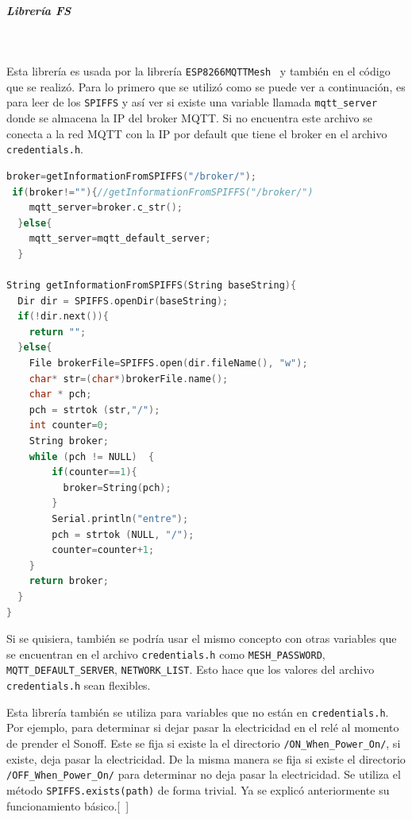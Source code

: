 \subparagraph{Librería FS}~

Esta librería es usada por la librería \lstinline[columns=fixed]{ESP8266MQTTMesh}~ y también en el código que se realizó. Para lo primero que se utilizó como se puede ver a continuación,  es para leer de los \lstinline[columns=fixed]{SPIFFS} y así ver si existe una variable llamada \lstinline[columns=fixed]{mqtt_server} donde se almacena la IP del broker MQTT. Si no encuentra este archivo se conecta a  la red MQTT con la IP por default que tiene el broker en el archivo \lstinline[columns=fixed]{credentials.h}.

\begin{lstlisting}[language=C]
broker=getInformationFromSPIFFS("/broker/");
 if(broker!=""){//getInformationFromSPIFFS("/broker/")
    mqtt_server=broker.c_str();
  }else{
    mqtt_server=mqtt_default_server;
  }

String getInformationFromSPIFFS(String baseString){
  Dir dir = SPIFFS.openDir(baseString);
  if(!dir.next()){
    return "";
  }else{
    File brokerFile=SPIFFS.open(dir.fileName(), "w");
    char* str=(char*)brokerFile.name();
    char * pch;
    pch = strtok (str,"/");
    int counter=0;
    String broker;
    while (pch != NULL)  {
        if(counter==1){
          broker=String(pch);
        }
        Serial.println("entre");
        pch = strtok (NULL, "/");
        counter=counter+1;
    }
    return broker;
  }
}
\end{lstlisting}

Si se quisiera, también se podría usar el mismo concepto con otras variables que se encuentran en el archivo \lstinline[columns=fixed]{credentials.h} como \lstinline[columns=fixed]{MESH_PASSWORD}, \lstinline[columns=fixed]{MQTT_DEFAULT_SERVER}, \lstinline[columns=fixed]{NETWORK_LIST}. Esto hace que los valores del archivo \lstinline[columns=fixed]{credentials.h} sean flexibles. 

Esta librería también se utiliza para variables que no están en \lstinline[columns=fixed]{credentials.h}. Por ejemplo, para determinar si dejar pasar la electricidad en el relé al momento de prender el Sonoff. Este se fija si existe la el directorio \lstinline[columns=fixed]{/ON_When_Power_On/}, si existe, deja pasar la electricidad. De la misma manera se fija si existe el directorio \lstinline[columns=fixed]{/OFF_When_Power_On/} para determinar no deja pasar la electricidad. Se utiliza el método \lstinline[columns=fixed]{SPIFFS.exists(path)} de forma trivial. Ya se explicó anteriormente su funcionamiento básico.[~]

